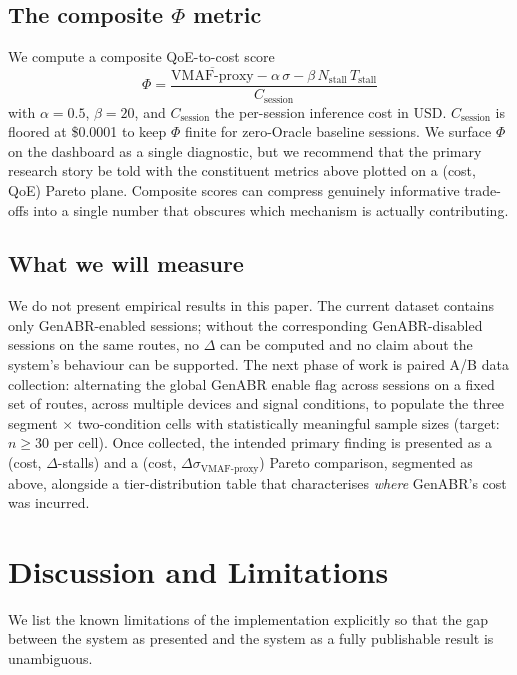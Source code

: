 \documentclass[conference]{IEEEtran}
\begin{document}
\subsection{The composite $\Phi$ metric}
We compute a composite QoE-to-cost score
\begin{equation}
  \Phi = \frac{\overline{\text{VMAF-proxy}} - \alpha \, \sigma - \beta \, N_{\text{stall}} \, T_{\text{stall}}}{C_{\text{session}}}
\end{equation}
with $\alpha = 0.5$, $\beta = 20$, and $C_{\text{session}}$ the per-session
inference cost in USD. $C_{\text{session}}$ is floored at \$0.0001 to
keep $\Phi$ finite for zero-Oracle baseline sessions. We surface $\Phi$
on the dashboard as a single diagnostic, but we recommend that the
primary research story be told with the constituent metrics above
plotted on a (cost, QoE) Pareto plane. Composite scores can compress
genuinely informative trade-offs into a single number that obscures
which mechanism is actually contributing.

\subsection{What we will measure}
We do not present empirical results in this paper. The current dataset
contains only GenABR-enabled sessions; without the corresponding
GenABR-disabled sessions on the same routes, no $\Delta$ can be
computed and no claim about the system's behaviour can be supported.
The next phase of work is paired A/B data collection: alternating the
global GenABR enable flag across sessions on a fixed set of routes,
across multiple devices and signal conditions, to populate the three
segment $\times$ two-condition cells with statistically meaningful
sample sizes (target: $n \geq 30$ per cell). Once collected, the
intended primary finding is presented as a (cost, $\Delta$-stalls) and a
(cost, $\Delta\sigma_{\text{VMAF-proxy}}$) Pareto comparison, segmented as
above, alongside a tier-distribution table that characterises
\emph{where} GenABR's cost was incurred.

\section{Discussion and Limitations}

We list the known limitations of the implementation explicitly so that
the gap between the system as presented and the system as a fully
publishable result is unambiguous.
\end{document}
